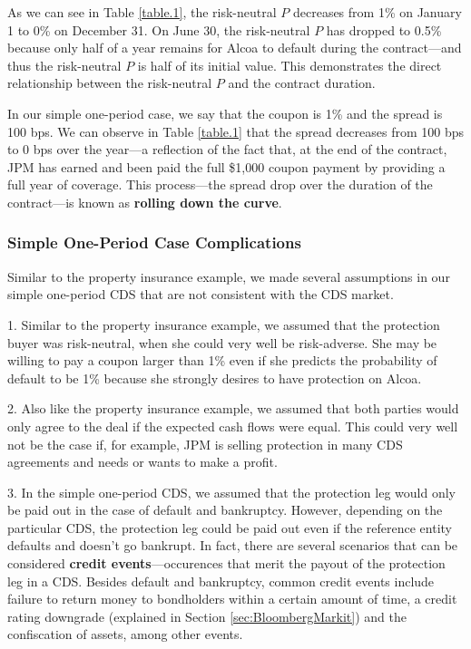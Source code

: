 \documentclass{jss}
\begin{document}
As we can see in Table \ref{table.1}, the risk-neutral $P$ decreases from 1\% on January 1 to 0\% on December 31. On June 30, the risk-neutral $P$ has dropped to 0.5\% because only half of a year remains for Alcoa to default during the contract---and thus the risk-neutral $P$ is half of its initial value. This demonstrates the direct relationship between the risk-neutral $P$ and the contract duration. 

In our simple one-period case, we say that the coupon is 1\% and the spread is 100 bps. We can observe in Table \ref{table.1} that the spread decreases from 100 bps to 0 bps over the year---a reflection of the fact that, at the end of the contract, JPM has earned and been paid the full \$1,000 coupon payment by providing a full year of coverage. This process---the spread drop over the duration of the contract---is known as \textbf{rolling down the curve}. 

\subsubsection{Simple One-Period Case Complications}
\label{OnePeriodComp}

Similar to the property insurance example, we made several assumptions in our simple one-period CDS that are not consistent with the CDS market. 

1. Similar to the property insurance example, we assumed that the protection buyer was risk-neutral, when she could very well be risk-adverse. She may be willing to pay a coupon larger than 1\% even if she predicts the probability of default to be 1\% because she strongly desires to have protection on Alcoa.

2. Also like the property insurance example, we assumed that both parties would only agree to the deal if the expected cash flows were equal. This could very well not be the case if, for example, JPM is selling protection in many CDS agreements and needs or wants to make a profit.

3. In the simple one-period CDS, we assumed that the protection leg would only be paid out in the case of default and bankruptcy. However, depending on the particular CDS, the protection leg could be paid out even if the reference entity defaults and doesn't go bankrupt. In fact, there are several scenarios that can be considered \textbf{credit events}---occurences that merit the payout of the protection leg in a CDS. Besides default and bankruptcy, common credit events include failure to return money to bondholders within a certain amount of time, a credit rating downgrade (explained in Section \ref{sec:BloombergMarkit}) and the confiscation of assets, among other events.
\end{document}
